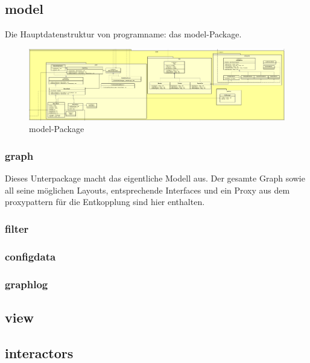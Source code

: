 \subsection{model}
\label{subsec:model}

Die Hauptdatenstruktur von \gls{programname}: das model-Package.

\begin{figure}[H]
  \centering
  \includegraphics[width=\textwidth]{../diagramimages/model.png}
  \caption{model-Package}
\end{figure}

    \subsubsection{graph}
    \label{subsubsec:graph}
    Dieses Unterpackage macht das eigentliche Modell aus. Der gesamte Graph sowie
    all seine möglichen Layouts, entsprechende Interfaces und ein Proxy aus dem
    \gls{proxypattern} für die Entkopplung sind hier enthalten.
    \subsubsection{filter}
    \label{subsubsec:filter}

    \subsubsection{configdata}
    \label{subsubsec:configdata}

    \subsubsection{graphlog}
    \label{subsubsec:graphlog}


\subsection{view}
\label{subsec:view}

\subsection{interactors}
\label{subsec:interactors}
